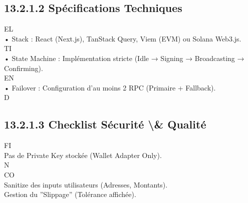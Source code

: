 \subsection{13.2.1.2 Spécifications Techniques}
\vspace{0.5em}
\vspace{0.5em}
\vspace{0.5em}
\vspace{0.5em}
EL\\
• Stack : React (Next.js), TanStack Query, Viem (EVM) ou Solana Web3.js.\\
\vspace{0.5em}
\vspace{0.5em}
\vspace{0.5em}
\vspace{0.5em}
TI\\
• State Machine : Implémentation stricte (Idle → Signing → Broadcasting → Confirming).\\
\vspace{0.5em}
\vspace{0.5em}
\vspace{0.5em}
\vspace{0.5em}
EN\\
• Failover : Configuration d’au moins 2 RPC (Primaire + Fallback).\\
\vspace{0.5em}
\vspace{0.5em}
\vspace{0.5em}
\vspace{0.5em}
D\\
\subsection{13.2.1.3 Checklist Sécurité \textbackslash{}& Qualité}
\vspace{0.5em}
\vspace{0.5em}
\vspace{0.5em}
\vspace{0.5em}
FI\\
Pas de Private Key stockée (Wallet Adapter Only).\\
N\\
CO\\
Sanitize des inputs utilisateurs (Adresses, Montants).\\
\vspace{0.5em}
Gestion du ”Slippage” (Tolérance affichée).\\
\vspace{0.5em}
